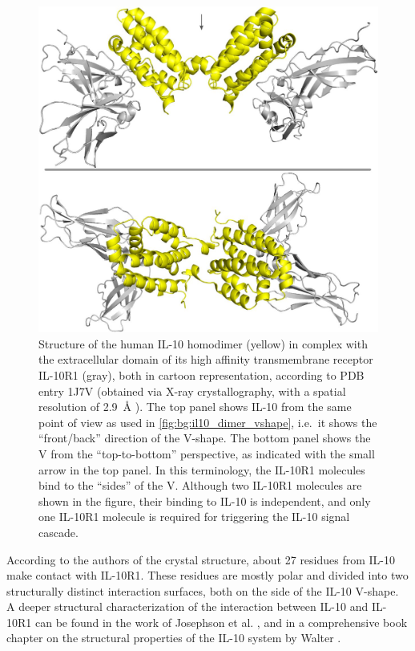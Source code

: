 \begin{figure}
\centering
\includegraphics[width=1.0\textwidth]{gfx/background/il10r1_il10_complex_topside_02.jpg}
\caption[]{
Structure of the human IL-10 homodimer (yellow) in complex with the
extracellular domain of its high affinity transmembrane receptor IL-10R1 (gray),
both in cartoon representation, according to PDB entry 1J7V (obtained via X-ray
crystallography, with a spatial resolution of \SI{2.9}{\angstrom}
\cite{Josephson2001}). The top panel shows IL-10 from the same point of view as
used in \cref{fig:bg:il10_dimer_vshape}, i.e.\ it shows the \enquote{front/back}
direction of the V-shape. The bottom panel shows the V from the
\enquote{top-to-bottom} perspective, as indicated with the small arrow in the
top panel. In this terminology, the IL-10R1 molecules bind to the
\enquote{sides} of the V. Although two IL-10R1 molecules are shown in the
figure, their binding to IL-10 is independent, and only one IL-10R1 molecule is
required for triggering the IL-10 signal cascade.}
\label{fig:bg:il10_il10r1_complex}
\end{figure}

According to the authors of the crystal structure, about 27 residues from IL-10
make contact with IL-10R1. These residues are mostly polar and divided into two
structurally distinct interaction surfaces, both on the side of the IL-10
V-shape. A deeper structural characterization of the interaction between IL-10
and IL-10R1 can be found in the work of Josephson et al. \cite{Josephson2001},
and in a comprehensive book chapter on the structural properties of the IL-10
system by Walter \cite{bookchapter_walter_il10_2004}.


